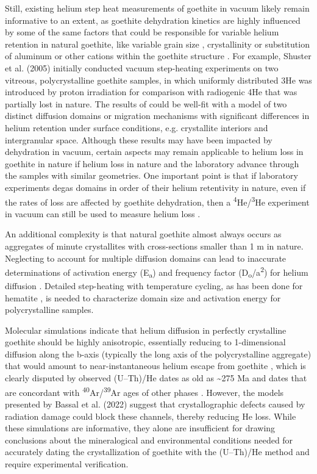 Still, existing helium step heat measurements of goethite in vacuum
likely remain informative to an extent, as goethite dehydration kinetics
are highly influenced by some of the same factors that could be
responsible for variable helium retention in natural goethite, like
variable grain size \citep{navrotsky2008,guobarnard2011,goss1987}, crystallinity \citep{schwertmann1985} or substitution of
aluminum or other cations within the goethite structure \citep{majzlan2003,bassal2022}. For example, Shuster et al. (2005) initially
conducted vacuum step-heating experiments on two vitreous,
polycrystalline goethite samples, in which uniformly distributed 3He was
introduced by proton irradiation for comparison with radiogenic 4He that
was partially lost in nature. The results of \citet{shustervasconcelos2005} could
be well-fit with a model of two distinct diffusion domains or migration
mechanisms with significant differences in helium retention under
surface conditions, e.g. crystallite interiors and intergranular space.
Although these results may have been impacted by dehydration in vacuum,
certain aspects may remain applicable to helium loss in goethite in
nature if helium loss in nature and the laboratory advance through the
samples with similar geometries. One important point is that if
laboratory experiments degas domains in order of their helium
retentivity in nature, even if the rates of loss are affected by
goethite dehydration, then a \textsuperscript{4}He/\textsuperscript{3}He
experiment in vacuum can still be used to measure helium loss \citep{shustervasconcelos2005,vasconcelos2013}.

An additional complexity is that natural goethite almost always occurs
as aggregates of minute crystallites with cross-sections smaller than 1
\textmu m in nature. Neglecting to account for multiple diffusion domains can
lead to inaccurate determinations of activation energy
(E\textsubscript{a}) and frequency factor
(D\textsubscript{o}/a\textsuperscript{2}) for helium diffusion \citep{farley2018}. Detailed step-heating with temperature cycling, as has been done
for hematite \citep{farleyflowers2012,farley2018}, is needed to
characterize domain size and activation energy for polycrystalline
samples.

Molecular simulations indicate that helium diffusion in perfectly
crystalline goethite should be highly anisotropic, essentially reducing
to 1-dimensional diffusion along the b-axis (typically the long axis of
the polycrystalline aggregate) that would amount to near-instantaneous
helium escape from goethite \citep{bassal2022}, which is clearly
disputed by observed (U--Th)/He dates as old as \textasciitilde275 Ma
\citep{waltenberg2012} and dates that are concordant with
\textsuperscript{40}Ar/\textsuperscript{39}Ar ages of other phases
\citep{vasconcelos2013}. However, the models presented by Bassal et
al. (2022) suggest that crystallographic defects caused by radiation
damage could block these channels, thereby reducing He loss. While these
simulations are informative, they alone are insufficient for drawing
conclusions about the mineralogical and environmental conditions needed
for accurately dating the crystallization of goethite with the
(U--Th)/He method and require experimental verification.

